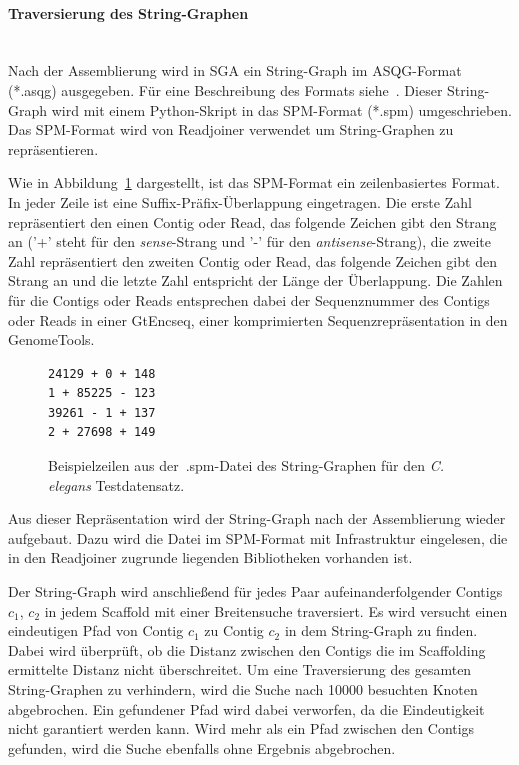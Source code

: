 \documentclass[a4paper,11pt,parskip,abstract=on]{scrartcl}
\begin{document}
\paragraph{Traversierung des String-Graphen}~\\
Nach der Assemblierung wird in SGA ein String-Graph im ASQG-Format
(*.asqg) ausgegeben. Für eine Beschreibung des Formats
siehe~\cite{asqg}. Dieser String-Graph wird mit einem Python-Skript in
das SPM-Format (*.spm) umgeschrieben. Das SPM-Format wird von
Readjoiner verwendet um String-Graphen zu repräsentieren.

Wie in Abbildung~\ref{abb: spm} dargestellt, ist das SPM-Format ein
zeilenbasiertes Format. In jeder Zeile ist eine Suffix-Präfix-Überlappung
eingetragen. Die erste Zahl repräsentiert den einen Contig oder Read,
das folgende Zeichen gibt den Strang an ('+' steht für den
\textit{sense}-Strang und '-' für den \textit{antisense}-Strang), die
zweite Zahl repräsentiert den zweiten Contig oder Read, das folgende
Zeichen gibt den Strang an und die letzte Zahl entspricht der Länge
der Überlappung. Die Zahlen für die Contigs oder Reads entsprechen
dabei der Sequenznummer des Contigs oder Reads in einer GtEncseq,
einer komprimierten Sequenzrepräsentation in den GenomeTools.

\begin{figure}
  \centering
\begin{verbatim}
24129 + 0 + 148
1 + 85225 - 123
39261 - 1 + 137
2 + 27698 + 149
\end{verbatim}
\caption{\label{abb: spm}Beispielzeilen aus der~.spm-Datei des
  String-Graphen für den \textit{C. elegans} Testdatensatz.}
\end{figure}

Aus dieser Repräsentation wird der String-Graph nach der Assemblierung
wieder aufgebaut. Dazu wird die Datei im SPM-Format mit Infrastruktur
eingelesen, die in den Readjoiner zugrunde liegenden Bibliotheken
vorhanden ist.

Der String-Graph wird anschließend für jedes Paar
aufeinanderfolgender Contigs $c_1$, $c_2$ in jedem Scaffold mit einer
Breitensuche traversiert. Es wird versucht einen eindeutigen Pfad von
Contig $c_1$ zu Contig $c_2$ in dem String-Graph zu finden. Dabei wird
überprüft, ob die Distanz zwischen den Contigs die im Scaffolding
ermittelte Distanz nicht überschreitet. Um eine Traversierung des
gesamten String-Graphen zu verhindern, wird die Suche nach \num{10000}
besuchten Knoten abgebrochen. Ein gefundener Pfad wird dabei
verworfen, da die Eindeutigkeit nicht garantiert werden kann. Wird
mehr als ein Pfad zwischen den Contigs gefunden, wird die Suche
ebenfalls ohne Ergebnis abgebrochen.
\end{document}
